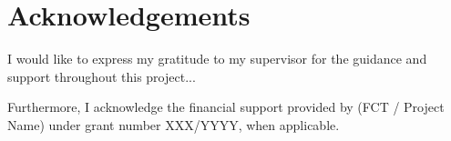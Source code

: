\chapter*{Acknowledgements}

I would like to express my gratitude to my supervisor for the guidance and support throughout this project...

Furthermore, I acknowledge the financial support provided by (FCT / Project Name) under grant number XXX/YYYY, when applicable.
\newpage
